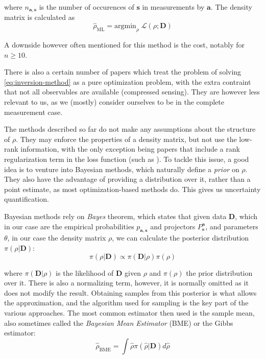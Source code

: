 \documentclass[12pt]{memoir}
\newcommand{\mb}{\mathbf}
\newcommand{\ti}{\textit}
\begin{document}
where $n_{\mb a,\mb s}$ is the number of occurences of $\mb s$ in measurements by $\mb a$. The density matrix is calculated as
\begin{equation}
    \hat \rho_{\text{ML}} = \text{argmin}_{\rho} \;\mathcal{L}(\rho;\mb{D})
\end{equation}

A downside however often mentioned for this method is the cost, notably for $n\geq10$.

\medbreak


There is also a certain number of papers \cite{meth:CS:GLFSBE10,meth:CS:Gross-2011, meth:CS:Flammia-2012,meth:CS:Koltchinskii-2011} which treat the problem of solving \ref{eq:inversion-method} as a pure optimization problem, with the extra contraint that not all observables are available (compressed sensing). They are however less relevant to us, as we (mostly) consider ourselves to be in the complete measurement case.\medbreak


The methods described so far do not make any assumptions about the structure of $\rho$. They may enforce the properties of a density matrix, but not use the low-rank information, with the only exception being papers that include a rank regularization term in the loss function (such as \cite{meth:linear-inversion:alquier}). To tackle this issue, a good idea is to venture into Bayesian methods, which naturally define a \textit{prior} on $\rho$. They also have the advantage of providing a distribution over it, rather than a point estimate, as most optimization-based methods do. This gives us uncertainty quantification.\medbreak


Bayesian methods rely on \ti{Bayes} theorem, which states that given data $\mb{D}$, which in our case are the empirical probabilities $p_{\mb a, \mb s}$ and projectors $P^{\mb a}_{\mb s}$, and parameters $\theta$, in our case the density matrix $\rho$, we can calculate the posterior distribution $\pi(\rho|\mb{D})$:
\begin{equation}
    \pi(\rho|\mb{D}) \propto \pi(\mb{D}|\rho) \pi(\rho)
\end{equation}

where $\pi(\mb{D}|\rho)$ is the likelihood of $\mb{D}$ given $\rho$ and $\pi(\rho)$ the prior distribution over it. There is also a normalizing term, however, it is normally omitted as it does not modify the result. Obtaining samples from this posterior is what allows the approximation, and the algorithm used for sampling is the key part of the various approaches. The most common estimator then used is the sample mean, also sometimes called the \ti{Bayesian Mean Estimator} (BME) or the Gibbs estimator:
\begin{equation}
    \hat \rho_{\text{BME}} = \int \hat \rho \pi(\hat \rho|\mb D) d\hat \rho
\end{equation}
\end{document}
